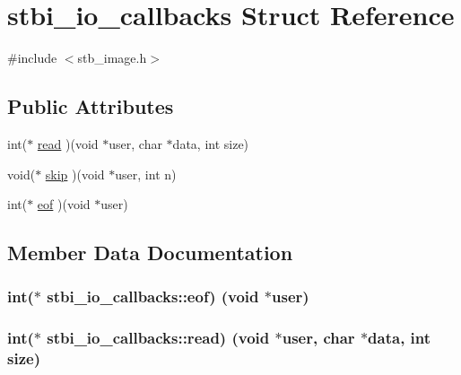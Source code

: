 \hypertarget{structstbi__io__callbacks}{}\section{stbi\+\_\+io\+\_\+callbacks Struct Reference}
\label{structstbi__io__callbacks}


{\ttfamily \#include $<$stb\+\_\+image.\+h$>$}

\subsection*{Public Attributes}
\begin{DoxyCompactItemize}
\item 
int($\ast$ \hyperlink{structstbi__io__callbacks_a623e46b3a2a019611601409926283a88}{read} )(void $\ast$user, char $\ast$data, int size)
\item 
void($\ast$ \hyperlink{structstbi__io__callbacks_a257aac5480a90a6c4b8fbe86c1b01068}{skip} )(void $\ast$user, int n)
\item 
int($\ast$ \hyperlink{structstbi__io__callbacks_a319639db2f76e715eed7a7a974136832}{eof} )(void $\ast$user)
\end{DoxyCompactItemize}


\subsection{Member Data Documentation}
\subsubsection[{\texorpdfstring{eof}{eof}}]{\setlength{\rightskip}{0pt plus 5cm}int($\ast$ stbi\+\_\+io\+\_\+callbacks\+::eof) (void $\ast$user)}\hypertarget{structstbi__io__callbacks_a319639db2f76e715eed7a7a974136832}{}\label{structstbi__io__callbacks_a319639db2f76e715eed7a7a974136832}
\subsubsection[{\texorpdfstring{read}{read}}]{\setlength{\rightskip}{0pt plus 5cm}int($\ast$ stbi\+\_\+io\+\_\+callbacks\+::read) (void $\ast$user, char $\ast$data, int size)}\hypertarget{structstbi__io__callbacks_a623e46b3a2a019611601409926283a88}{}\label{structstbi__io__callbacks_a623e46b3a2a019611601409926283a88}
